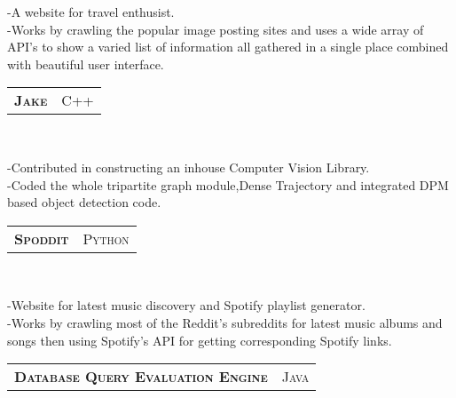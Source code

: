 \documentclass[10pt,a4paper,oneside]{article}
\begin{document}
     \vspace{-4mm}
    \begin{adjustwidth}{7pt}{0pt}
        {\footnotesize -A website for travel
        enthusist.\\
        -Works by crawling the popular image posting sites and
        uses a wide array of API's to show a varied list of
        information all gathered in a single place combined with
        beautiful user interface. }\\
    \end{adjustwidth}
    \vspace{-6pt}
    \begin{tabular}{c|c}
        \textbf{\normalsize J\textsc{ake}}
        &\textmd{\normalsize C\textsc{++}}
    \end{tabular}\\
     \vspace{-4mm}
    \begin{adjustwidth}{7pt}{0pt}
        {\footnotesize -Contributed in constructing an inhouse
        Computer Vision Library.\\
        -Coded the whole tripartite graph module,Dense
        Trajectory and integrated DPM based object detection code.}\\
    \end{adjustwidth}
    \vspace{-6pt}
    \begin{tabular}{c|c}
        \textbf{\normalsize S\textsc{poddit}}
        &\textmd{\normalsize P\textsc{ython}}
    \end{tabular}\\
     \vspace{-4mm}
    \begin{adjustwidth}{7pt}{0pt}
        {\footnotesize -Website for latest music
        discovery and Spotify playlist generator.\\
        -Works by crawling most of the Reddit's subreddits for
        latest music albums and songs then using Spotify's API for
        getting corresponding Spotify links.}\\
    \end{adjustwidth}
    \vspace{-6pt}
    \begin{tabular}{c|c}
        \textbf{\normalsize D\textsc{atabase} Q\textsc{uery}
        E\textsc{valuation} E\textsc{ngine}}
        &\textmd{\normalsize J\textsc{ava}}
    \end{tabular}\\
\end{document}
